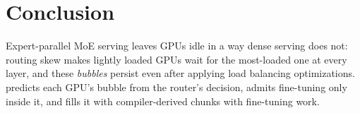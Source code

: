 \section{Conclusion}
\label{sec:conclusion}

Expert-parallel \ac{MoE} serving leaves GPUs idle in a way dense serving does not: routing skew makes lightly loaded GPUs wait for the most-loaded one at every layer, and these \emph{bubbles} persist even after applying load balancing optimizations.
\sys predicts each GPU's bubble from the router's decision, admits fine-tuning only inside it, and fills it with
compiler-derived chunks with fine-tuning work.
